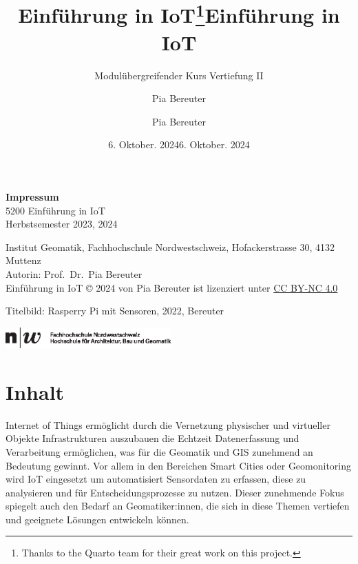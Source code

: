 \documentclass[
  11pt,
  a4paperpaper,
  oneside, openany  ,captions=tableheading
]{scrbook}
\title{Einführung in IoT\thanks{Thanks to the Quarto team for their
great work on this project.}}
\subtitle{Modulübergreifender Kurs Vertiefung II}
\author{Pia Bereuter}
\date{6. Oktober. 2024}
\title{Einführung in IoT}
\author{Pia Bereuter}
\date{6. Oktober. 2024}
\renewcommand*\contentsname{Inhaltsverzeichnis}
\newcommand\contentsname{Inhaltsverzeichnis}
\theoremstyle{definition}
\theoremstyle{remark}
\begin{document}
\clearpage
\thispagestyle{empty}
\makeatletter%
\makeatother%
\clearpage
\thispagestyle{empty}
\vspace*{\fill}
{\footnotesize 
\textbf{Impressum} \\
5200 Einführung in IoT\\
Herbstsemester 2023, 2024

Institut Geomatik, Fachhochschule Nordwestschweiz, Hofackerstrasse 30,
4132 Muttenz\\
Autorin: Prof.~Dr.~Pia Bereuter\\
Einführung in IoT © 2024 von Pia Bereuter ist lizenziert unter
\href{https://creativecommons.org/licenses/by-nc/4.0/}{CC BY-NC 4.0}

Titelbild: Rasperry Pi mit Sensoren, 2022, Bereuter

\includegraphics[height=8mm]{images/fhnw.eps}}
\clearpage

\frontmatter


\renewcommand*\contentsname{Inhaltsverzeichnis}
{
\hypersetup{linkcolor=}
\setcounter{tocdepth}{1}
\tableofcontents
}

%		


\mainmatter
{}

\chapter*{Inhalt}\label{inhalt}


Internet of Things ermöglicht durch die Vernetzung physischer und
virtueller Objekte Infrastrukturen auszubauen die Echtzeit
Datenerfassung und Verarbeitung ermöglichen, was für die Geomatik und
GIS zunehmend an Bedeutung gewinnt. Vor allem in den Bereichen Smart
Cities oder Geomonitoring wird IoT eingesetzt um automatisiert
Sensordaten zu erfassen, diese zu analysieren und für
Entscheidungsprozesse zu nutzen. Dieser zunehmende Fokus spiegelt auch
den Bedarf an Geomatiker:innen, die sich in diese Themen vertiefen und
geeignete Lösungen entwickeln können.
\end{document}
